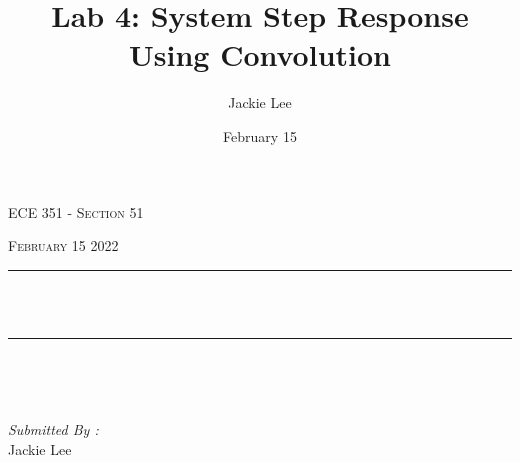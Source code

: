 \documentclass[12pt]{report}
\title{Lab 4: System Step Response Using Convolution}
\author{ Jackie Lee}
\date{February 15}
\makeatletter
\let\thetitle\@title
\makeatother
\begin{document}

\begin{titlepage}
	\centering
    \vspace*{0.5 cm}
\begin{center}    \textsc{\Large   ECE 351 - Section 51 }\\[2.0 cm]	\end{center}%
	\textsc{\Large February 15 2022  }\\[0.5 cm]				%
	\rule{\linewidth}{0.2 mm} \\[0.4 cm]
	{ \huge \bfseries \thetitle}\\
	\rule{\linewidth}{0.2 mm} \\[1.5 cm]
	
	\begin{minipage}{0.4\textwidth}
		\begin{flushleft} \large
			\end{flushleft}
			\end{minipage}~
			\begin{minipage}{0.4\textwidth}
            
			\begin{flushright} \large
			\emph{Submitted By :} \\
			Jackie Lee  
		\end{flushright}
           
	\end{minipage}\\[2 cm]
	
    
    
    
    
	
\end{titlepage}


\tableofcontents
\pagebreak

\renewcommand{\thesection}{\arabic{section}}
\end{document}
